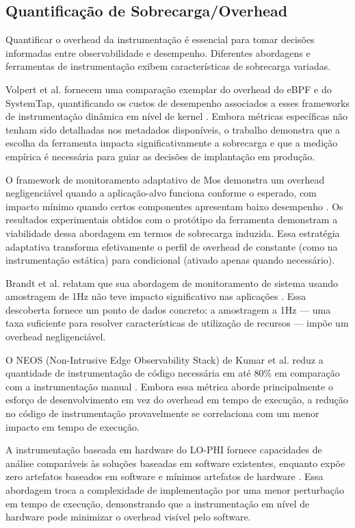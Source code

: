 \documentclass[sigconf, anonymous]{acmart}
\begin{document}
\subsection{Quantificação de Sobrecarga/Overhead}

Quantificar o overhead da instrumentação é essencial para tomar decisões informadas entre observabilidade e desempenho. Diferentes abordagens e ferramentas de instrumentação exibem características de sobrecarga variadas.

Volpert et al. fornecem uma comparação exemplar do overhead do eBPF e do SystemTap, quantificando os custos de desempenho associados a esses frameworks de instrumentação dinâmica em nível de kernel \cite{volpert_2025}. Embora métricas específicas não tenham sido detalhadas nos metadados disponíveis, o trabalho demonstra que a escolha da ferramenta impacta significativamente a sobrecarga e que a medição empírica é necessária para guiar as decisões de implantação em produção.

O framework de monitoramento adaptativo de Mos demonstra um overhead negligenciável quando a aplicação-alvo funciona conforme o esperado, com impacto mínimo quando certos componentes apresentam baixo desempenho \cite{mos_2004}. Os resultados experimentais obtidos com o protótipo da ferramenta demonstram a viabilidade dessa abordagem em termos de sobrecarga induzida. Essa estratégia adaptativa transforma efetivamente o perfil de overhead de constante (como na instrumentação estática) para condicional (ativado apenas quando necessário).

Brandt et al. relatam que sua abordagem de monitoramento de sistema usando amostragem de 1Hz não teve impacto significativo nas aplicações \cite{brandt_2018}. Essa descoberta fornece um ponto de dados concreto: a amostragem a 1Hz — uma taxa suficiente para resolver características de utilização de recursos — impõe um overhead negligenciável.

O NEOS (Non-Intrusive Edge Observability Stack) de Kumar et al. reduz a quantidade de instrumentação de código necessária em até 80\% em comparação com a instrumentação manual \cite{kumar_2023}. Embora essa métrica aborde principalmente o esforço de desenvolvimento em vez do overhead em tempo de execução, a redução no código de instrumentação provavelmente se correlaciona com um menor impacto em tempo de execução.

A instrumentação baseada em hardware do LO-PHI fornece capacidades de análise comparáveis às soluções baseadas em software existentes, enquanto expõe zero artefatos baseados em software e mínimos artefatos de hardware \cite{spensky_2016}. Essa abordagem troca a complexidade de implementação por uma menor perturbação em tempo de execução, demonstrando que a instrumentação em nível de hardware pode minimizar o overhead visível pelo software.
\end{document}
